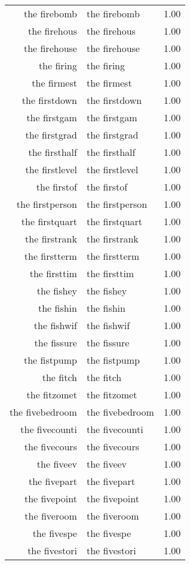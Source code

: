\begin{table}[ht]
\begin{tabular}{rlr}
  the firebomb & the firebomb & 1.00 \\ 
  the firehous & the firehous & 1.00 \\ 
  the firehouse & the firehouse & 1.00 \\ 
  the firing & the firing & 1.00 \\ 
  the firmest & the firmest & 1.00 \\ 
  the firstdown & the firstdown & 1.00 \\ 
  the firstgam & the firstgam & 1.00 \\ 
  the firstgrad & the firstgrad & 1.00 \\ 
  the firsthalf & the firsthalf & 1.00 \\ 
  the firstlevel & the firstlevel & 1.00 \\ 
  the firstof & the firstof & 1.00 \\ 
  the firstperson & the firstperson & 1.00 \\ 
  the firstquart & the firstquart & 1.00 \\ 
  the firstrank & the firstrank & 1.00 \\ 
  the firstterm & the firstterm & 1.00 \\ 
  the firsttim & the firsttim & 1.00 \\ 
  the fishey & the fishey & 1.00 \\ 
  the fishin & the fishin & 1.00 \\ 
  the fishwif & the fishwif & 1.00 \\ 
  the fissure & the fissure & 1.00 \\ 
  the fistpump & the fistpump & 1.00 \\ 
  the fitch & the fitch & 1.00 \\ 
  the fitzomet & the fitzomet & 1.00 \\ 
  the fivebedroom & the fivebedroom & 1.00 \\ 
  the fivecounti & the fivecounti & 1.00 \\ 
  the fivecours & the fivecours & 1.00 \\ 
  the fiveev & the fiveev & 1.00 \\ 
  the fivepart & the fivepart & 1.00 \\ 
  the fivepoint & the fivepoint & 1.00 \\ 
  the fiveroom & the fiveroom & 1.00 \\ 
  the fivespe & the fivespe & 1.00 \\ 
  the fivestori & the fivestori & 1.00 \\ 

\end{tabular}
\end{table}
